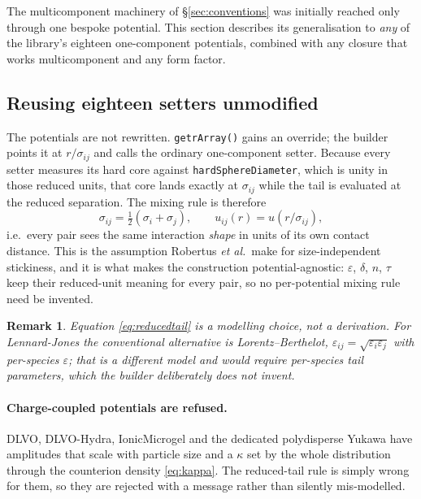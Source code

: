 \documentclass[11pt,a4paper]{article}
\newtheorem{remark}{Remark}
\newcommand{\code}[1]{\texttt{#1}}
\begin{document}
The multicomponent machinery of \S\ref{sec:conventions} was initially reached
only through one bespoke potential. This section describes its generalisation
to \emph{any} of the library's eighteen one-component potentials, combined
with any closure that works multicomponent and any form factor.

\subsection{Reusing eighteen setters unmodified}

The potentials are not rewritten. \code{getrArray()} gains an override; the
builder points it at $r/\sigma_{ij}$ and calls the ordinary one-component
setter. Because every setter measures its hard core against
\code{hardSphereDiameter}, which is unity in those reduced units, that core
lands exactly at $\sigma_{ij}$ while the tail is evaluated at the reduced
separation. The mixing rule is therefore
\begin{equation}
\sigma_{ij}=\tfrac12(\sigma_i+\sigma_j),
\qquad
u_{ij}(r) = u\!\left(r/\sigma_{ij}\right),
\label{eq:reducedtail}
\end{equation}
i.e.\ every pair sees the same interaction \emph{shape} in units of its own
contact distance. This is the assumption Robertus \emph{et al.}\ make for
size-independent stickiness, and it is what makes the construction
potential-agnostic: $\varepsilon$, $\delta$, $n$, $\tau$ keep their
reduced-unit meaning for every pair, so no per-potential mixing rule need be
invented.

\begin{remark}
Equation \eqref{eq:reducedtail} is a modelling choice, not a derivation. For
Lennard-Jones the conventional alternative is Lorentz--Berthelot,
$\varepsilon_{ij}=\sqrt{\varepsilon_i\varepsilon_j}$ with per-species
$\varepsilon$; that is a different model and would require per-species tail
parameters, which the builder deliberately does not invent.
\end{remark}

\paragraph{Charge-coupled potentials are refused.} DLVO, DLVO-Hydra,
IonicMicrogel and the dedicated polydisperse Yukawa have amplitudes that scale
with particle size and a $\kappa$ set by the whole distribution through the
counterion density \eqref{eq:kappa}. The reduced-tail rule is simply wrong for
them, so they are rejected with a message rather than silently mis-modelled.
\end{document}
